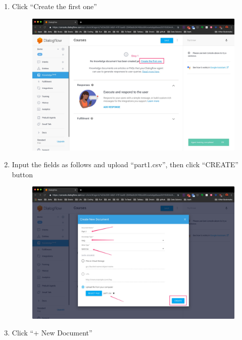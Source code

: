 \begin{enumerate}
	\item Click “Create the first one”

	\begin{figure}[H]
		\centering
		\includegraphics[width=\linewidth, frame]{img/manual_9.jpg}
	\end{figure}

	\item Input the fields as follows and upload “part1.csv”, then click “CREATE” button

	\begin{figure}[H]
		\centering
		\includegraphics[width=\linewidth, frame]{img/manual_10.jpg}
	\end{figure}

	\item Click “+ New Document”


\end{enumerate}
